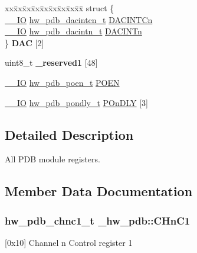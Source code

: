\begin{DoxyCompactItemize}
\begin{tabbing}
\end{tabbing}\item 
\begin{tabbing}
xx\=xx\=xx\=xx\=xx\=xx\=xx\=xx\=xx\=\kill
struct \{\\
\>\hyperlink{core__sc300_8h_aec43007d9998a0a0e01faede4133d6be}{\_\_IO} \hyperlink{union__hw__pdb__dacintcn}{hw\_pdb\_dacintcn\_t} \hyperlink{struct__hw__pdb_a3ebb817d26eb2afe7bf5649d265186f0}{DACINTCn}\\
\>\hyperlink{core__sc300_8h_aec43007d9998a0a0e01faede4133d6be}{\_\_IO} \hyperlink{union__hw__pdb__dacintn}{hw\_pdb\_dacintn\_t} \hyperlink{struct__hw__pdb_a445262c1560c3741f71dbb256688191a}{DACINTn}\\
\} {\bfseries DAC} \mbox{[}2\mbox{]}\hypertarget{struct__hw__pdb_ada519e8e658bab2b40b3dabdc219922a}{}\label{struct__hw__pdb_ada519e8e658bab2b40b3dabdc219922a}
\\

\end{tabbing}\item 
uint8\+\_\+t {\bfseries \+\_\+reserved1} \mbox{[}48\mbox{]}\hypertarget{struct__hw__pdb_aa95c7ba37c19462ed5dcdff620f86df0}{}\label{struct__hw__pdb_aa95c7ba37c19462ed5dcdff620f86df0}

\item 
\hyperlink{core__sc300_8h_aec43007d9998a0a0e01faede4133d6be}{\+\_\+\+\_\+\+IO} \hyperlink{union__hw__pdb__poen}{hw\+\_\+pdb\+\_\+poen\+\_\+t} \hyperlink{struct__hw__pdb_a95efa2922bac7bf585014e369bbcff04}{P\+O\+EN}
\item 
\hyperlink{core__sc300_8h_aec43007d9998a0a0e01faede4133d6be}{\+\_\+\+\_\+\+IO} \hyperlink{union__hw__pdb__pondly}{hw\+\_\+pdb\+\_\+pondly\+\_\+t} \hyperlink{struct__hw__pdb_a29e1cc44c17145f1ec6c1a915216d532}{P\+On\+D\+LY} \mbox{[}3\mbox{]}
\end{DoxyCompactItemize}


\subsection{Detailed Description}
All P\+DB module registers. 

\subsection{Member Data Documentation}
\subsubsection[{\texorpdfstring{C\+Hn\+C1}{CHnC1}}]{ {\bf hw\+\_\+pdb\+\_\+chnc1\+\_\+t} \+\_\+hw\+\_\+pdb\+::\+C\+Hn\+C1}\hypertarget{struct__hw__pdb_a0b64eff3dac33d1d9e4a4b22d2ab792c}{}\label{struct__hw__pdb_a0b64eff3dac33d1d9e4a4b22d2ab792c}
\mbox{[}0x10\mbox{]} Channel n Control register 1 
